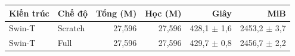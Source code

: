 \begin{tabular}{llrrrr}
\toprule
Kiến trúc & Chế độ & Tổng (M) & Học (M) & Giây & MiB \\
\midrule
Swin-T & Scratch & 27{,}596 & 27{,}596 & 428{,}1 $\pm$ 1{,}6 & 2453{,}2 $\pm$ 3{,}7 \\
Swin-T & Full & 27{,}596 & 27{,}596 & 429{,}7 $\pm$ 0{,}8 & 2456{,}7 $\pm$ 2{,}2 \\
\bottomrule
\end{tabular}
